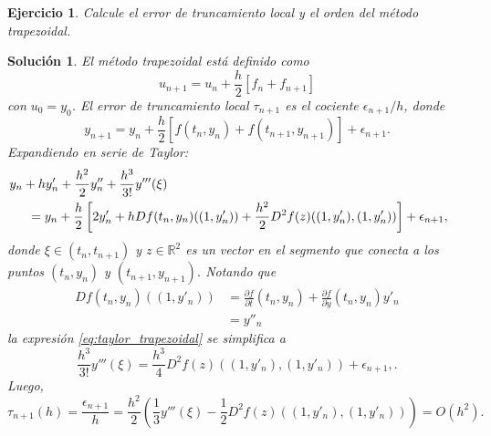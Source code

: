 \documentclass[11pt]{article}
\newtheorem{exercise}{Ejercicio}
\newtheorem*{sol}{Solución}
\newcommand\R{\mathbb R}
\begin{document}
\begin{exercise}
  Calcule el error de truncamiento local y el orden del método
  trapezoidal.
\end{exercise}
\begin{sol}
  El método trapezoidal está definido como
  \begin{equation}
    u_{n+1} = u_n + \frac{h}{2}[f_n + f_{n+1}]
  \end{equation}
  con $u_0=y_0$.
  El error de truncamiento local $\tau_{n+1}$ es el cociente
  $\epsilon_{n+1} / h$, donde
  \begin{equation}
    y_{n+1} = y_n + \frac{h}{2}[f(t_n,y_n)+f(t_{n+1},y_{n+1})] +
    \epsilon_{n+1}
  .\end{equation}
  Expandiendo en serie de Taylor:
  \begin{equation}\label{eq:taylor_trapezoidal}
    \begin{split}
    &\hspace{-5mm}
    y_{n}+hy'_n+\frac{h^{2}}{2}y''_n+\frac{h^{3}}{3!}y'''(\xi)
    \\
    &=
    y_n
    +
    \frac{h}{2} \left[
      2y'_n + h Df(t_n,y_n)((1,y'_n))
      + \frac{h^{2}}{2} D^{2}f(z)((1,y'_n),(1,y'_n))
    \right]
    + \epsilon_{n+1},
    \end{split}
  \end{equation}
  donde $\xi\in(t_n,t_{n+1})$ y $z\in\R^{2}$ es un vector en el
  segmento que conecta a los puntos $(t_n,y_n)$ y $(t_{n+1},y_{n+1})$.
  Notando que
  \begin{align}
    Df(t_n,y_n)((1,y'_n))
    &= \frac{\partial f}{\partial t}(t_n,y_n)
    + \frac{\partial f}{\partial y}(t_n,y_n)y'_n \\
    &= y''_n
  \end{align}
  la expresión \eqref{eq:taylor_trapezoidal} se simplifica a
  \begin{equation}
    \frac{h^{3}}{3!}y'''(\xi)
    =
    \frac{h^{3}}{4} D^{2}f(z)((1,y'_n),(1,y'_n))
    + \epsilon_{n+1},
  .\end{equation}
  Luego,
  \begin{equation}
    \tau_{n+1}(h)
    =
    \frac{\epsilon_{n+1}}{h}
    =
    \frac{h^{2}}{2}
    \left(
      \frac{1}{3}y'''(\xi)
      -
      \frac{1}{2}D^{2}f(z)((1,y'_n),(1,y'_n))
    \right)
    = O(h^{2})
  .\end{equation}
  
\end{sol}
\end{document}
